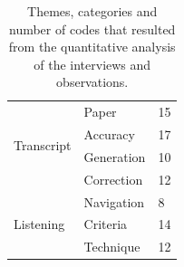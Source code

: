\begin{table}[h]
{\begin{tabular}{|l|l|l|}
      \multirow{4}{*}{Transcript}
      & Paper & 15 \\ \cline{2-3}%
      & Accuracy & 17 \\ \cline{2-3} %
      & Generation & 10 \\ \cline{2-3} %
      & Correction & 12 \\ \hline %
      \multirow{3}{*}{Listening}
      & Navigation & 8 \\ \cline{2-3} %
      & Criteria & 14 \\ \cline{2-3} %
      & Technique & 12 \\ \hline %

    \end{tabular}
  }
  \caption{Themes, categories and number of codes that resulted from the quantitative analysis of the interviews and
  observations.}
  \label{tab:paper-codes}
\end{table}



